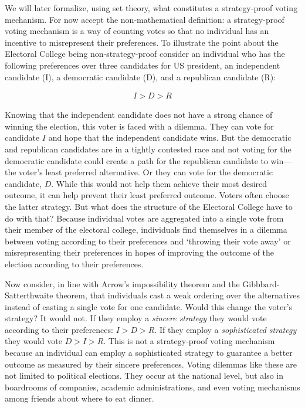 \documentclass{amsart}
\theoremstyle{plain}
\begin{document}
We will later formalize, using set theory, what constitutes a strategy-proof voting mechanism. For now accept the non-mathematical definition: a strategy-proof voting mechanism is a way of counting votes so that no individual has an incentive to misrepresent their preferences. To illustrate the point about the Electoral College being non-strategy-proof consider an individual who has the following preferences over three candidates for US president, an independent candidate (I), a democratic candidate (D), and a republican candidate (R):

\begin{align*}
    I > D > R
\end{align*}

Knowing that the independent candidate does not have a strong chance of winning the election, this voter is faced with a dilemma. They can vote for candidate $I$ and hope that the independent candidate wins. But the democratic and republican candidates are in a tightly contested race and not voting for the democratic candidate could create a path for the republican candidate to win—the voter's least preferred alternative. Or they can vote for the democratic candidate, $D$. While this would not help them achieve their most desired outcome, it can help prevent their least preferred outcome. Voters often choose the latter strategy. But what does the structure of the Electoral College have to do with that? Because individual votes are aggregated into a single vote from their member of the electoral college, individuals find themselves in a dilemma between voting according to their preferences and `throwing their vote away' or misrepresenting their preferences in hopes of improving the outcome of the election according to their preferences.



Now consider, in line with Arrow's impossibility theorem and the Gibbbard-Satterthwaite theorem, that individuals cast a weak ordering over the alternatives instead of casting a single vote for one candidate. Would this change the voter's strategy? It would not. If they employ a \emph{sincere strategy} they would vote according to their preferences: $I > D > R$. If they employ a \emph{sophisticated strategy} they would vote $D > I > R$. This is not a strategy-proof voting mechanism because an individual can employ a sophisticated strategy to guarantee a better outcome as measured by their sincere preferences. Voting dilemmas like these are not limited to political elections. They occur at the national level, but also in boardrooms of companies, academic administrations, and even voting mechanisms among friends about where to eat dinner.
\end{document}
